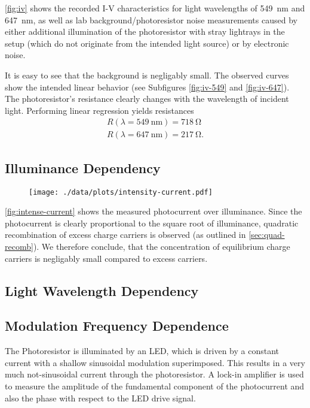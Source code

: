 \autoref{fig:iv} shows the recorded I-V characteristics for light wavelengths of \SI{549}{\nm} and \SI{647}{\nm}, as well as lab background/photoresistor noise measurements caused by either additional illumination of the photoresistor with stray lightrays in the setup (which do not originate from the intended light source) or by electronic noise.

It is easy to see that the background is negligably small.
The observed curves show the intended linear behavior (see Subfigures \ref{fig:iv-549} and \ref{fig:iv-647}).
The photoresistor's resistance clearly changes with the wavelength of incident light.
Performing linear regression yields resistances
\begin{align*}
  R(\lambda = \SI{549}{\nm}) = \SI{718}{\ohm} \\
  R(\lambda = \SI{647}{\nm}) = \SI{217}{\ohm}.
\end{align*}

\subsection{Illuminance Dependency}
\begin{figure}
	\centering
	\texttt{[image: ./data/plots/intensity-current.pdf]}
	\label{fig:intense-current}
\end{figure}

\autoref{fig:intense-current} shows the measured photocurrent over illuminance.
Since the photocurrent is clearly proportional to the square root of illuminance, quadratic recombination of excess charge carriers is observed (as outlined in \autoref{sec:quad-recomb}).
We therefore conclude, that the concentration of equilibrium charge carriers is negligably small compared to excess carriers.

\subsection{Light Wavelength Dependency}

\subsection{Modulation Frequency Dependence}
The Photoresistor is illuminated by an LED, which is driven by a constant current with a shallow sinusoidal modulation superimposed.
This results in a very much not-sinusoidal current through the photoresistor.
A lock-in amplifier is used to measure the amplitude of the fundamental component of the photocurrent and also the phase with respect to the LED drive signal.

